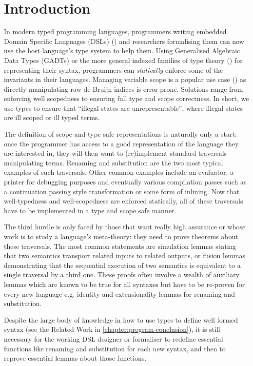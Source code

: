 \chapter{Introduction}

In modern typed programming languages, programmers writing embedded Domain Specific
Languages (DSLs) (\cite{hudak1996building}) and researchers formalising them can
now use the host language's type system to help them. Using Generalised Algebraic
Data Types (GADTs) or the more general indexed families of type theory
(\cite{dybjer1994inductive}) for representing their syntax, programmers can
\emph{statically} enforce some of the invariants in their languages. Managing
variable scope is a popular use case (\cite{altenkirch1999monadic}) as directly
manipulating raw de Bruijn indices is error-prone. Solutions range from enforcing
well scopedness to ensuring full type and scope correctness. In short, we use
types to ensure that ``illegal states are unrepresentable'', where illegal states
are ill scoped or ill typed terms.

The definition of scope-and-type safe representations is naturally only a start:
once the programmer has access to a good representation of the language they are
interested in, they will then want to (re)implement standard traversals
manipulating terms. Renaming and substitution are the two most typical examples
of such traversals. Other common examples include an evaluator, a printer for
debugging purposes and eventually various compilation passes such as a continuation
passing style transformation or some form of inlining. Now that well-typedness
and well-scopedness are enforced statically, all of these traversals have to be
implemented in a type and scope safe manner.

The third hurdle is only faced by those that want really high assurance or whose
work is to study a language's meta-theory: they need to prove theorems about these
traversals. The most common statements are simulation lemmas stating that two
semantics transport related inputs to related outputs, or fusion lemmas demonstrating
that the sequential execution of two semantics is equivalent to a single traversal
by a third one. These proofs often involve a wealth of auxiliary lemmas which are
known to be true for all syntaxes but have to be re-proven for every new language
e.g. identity and extensionality lemmas for renaming and substitution.

Despite the large body of knowledge in how to use types to define well formed
syntax (see the Related Work in \cref{chapter:program-conclusion}), it is still
necessary for the working DSL designer or formaliser to redefine essential
functions like renaming and substitution for each new syntax, and then to
reprove essential lemmas about those functions.

